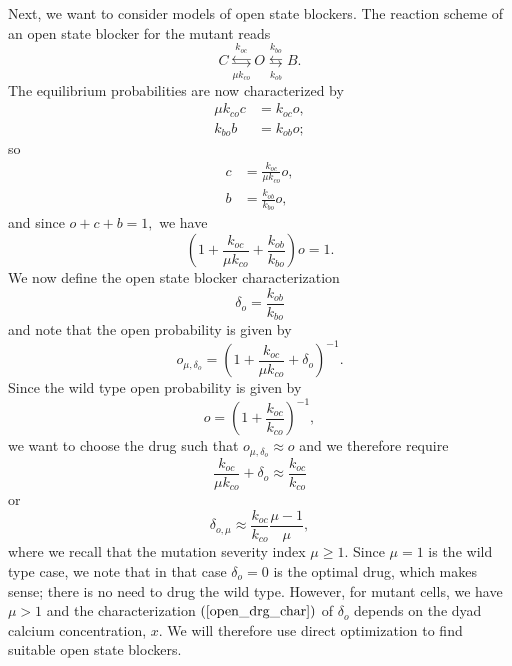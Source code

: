 Next, we want to consider models of open state blockers. The reaction scheme of an open state blocker for the mutant reads%
\[
C\underset{\mu k_{co}}{\overset{k_{oc}}{\leftrightarrows}}O\underset{k_{ob}%
}{\overset{k_{bo}}{\leftrightarrows}}B.
\]
The equilibrium probabilities are now characterized by%
\begin{align*}
\mu k_{co}c  &  =k_{oc}o,\\
k_{bo}b  &  =k_{ob}o;
\end{align*}
so%
\begin{align*}
c  &  =\frac{k_{oc}}{\mu k_{co}}o,\\
b  &  =\frac{k_{ob}}{k_{bo}}o,
\end{align*}
and since $o+c+b=1,$ we have%
\[
\left(  1+\frac{k_{oc}}{\mu k_{co}}+\frac{k_{ob}}{k_{bo}}\right)  o=1.
\]
We now define the open state blocker characterization%
\[
\delta_{o}=\frac{k_{ob}}{k_{bo}}%
\]
and note that the open probability is given by%
\[
o_{\mu,\delta_{o}}=\left(  1+\frac{k_{oc}}{\mu k_{co}}+\delta_{o}\right)  ^{-1}.%
\]
Since the wild type open probability is given by%
\[
o=\left(  1+\frac{k_{oc}}{k_{co}}\right)  ^{-1},%
\]
we want to choose the drug such that $o_{\mu,\delta_{o}}\approx o$ and we therefore 
require%
\[
\frac{k_{oc}}{\mu k_{co}}+\delta_{o}\approx\frac{k_{oc}}{k_{co}}%
\]
or%
\begin{equation}
\delta_{o,\mu}\approx\frac{k_{oc}}{k_{co}}\frac{\mu-1}{\mu},
\label{open_drg_char}%
\end{equation}
where we recall that the mutation severity index $\mu\geqslant1.$ Since
$\mu=1$ is the wild type case, we note that in that case $\delta_{o}=0$ is the
optimal drug, which makes sense; there is no need to drug the wild type. 
However, for
mutant cells, we have $\mu>1$ and the characterization $\left(
\ref{open_drg_char}\right)  $ of $\delta_{o}$ depends on the
dyad calcium concentration, $x.$ We will therefore use direct optimization to
find suitable open state blockers.

